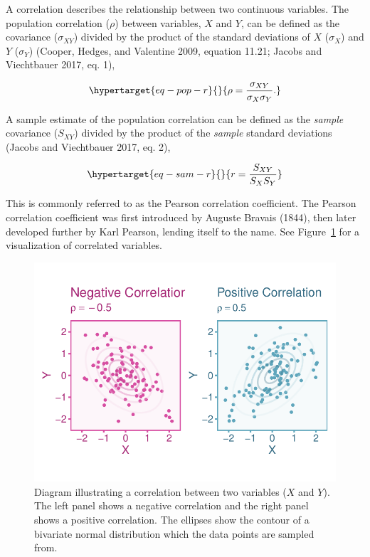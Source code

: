 \documentclass[
  letterpaper,
  DIV=11,
  numbers=noendperiod]{scrreprt}
\begin{document}
A correlation describes the relationship between two continuous
variables. The population correlation (\(\rho\)) between variables,
\(X\) and \(Y\), can be defined as the covariance (\(\sigma_{XY}\))
divided by the product of the standard deviations of \(X\)
(\(\sigma_{X}\)) and \(Y\) (\(\sigma_{Y}\)) (Cooper, Hedges, and
Valentine 2009, equation 11.21; Jacobs and Viechtbauer 2017, eq. 1),

\begin{equation}\protect\hypertarget{eq-pop-r}{}{
\rho = \frac{\sigma_{XY}}{\sigma_{X}\sigma_{Y}}.
}\label{eq-pop-r}\end{equation}

A sample estimate of the population correlation can be defined as the
\emph{sample} covariance (\(S_{XY}\)) divided by the product of the
\emph{sample} standard deviations (Jacobs and Viechtbauer 2017, eq. 2),

\begin{equation}\protect\hypertarget{eq-sam-r}{}{
r = \frac{S_{XY}}{S_XS_Y}
}\label{eq-sam-r}\end{equation}

This is commonly referred to as the Pearson correlation coefficient. The
Pearson correlation coefficient was first introduced by Auguste Bravais
(1844), then later developed further by Karl Pearson, lending itself to
the name. See Figure~\ref{fig-r} for a visualization of correlated
variables.

\begin{figure}[H]

{\centering \includegraphics{intro_files/figure-pdf/fig-r-1.pdf}

}

\caption{\label{fig-r}Diagram illustrating a correlation between two
variables (\(X\) and \(Y\)). The left panel shows a negative correlation
and the right panel shows a positive correlation. The ellipses show the
contour of a bivariate normal distribution which the data points are
sampled from.}

\end{figure}
\end{document}
